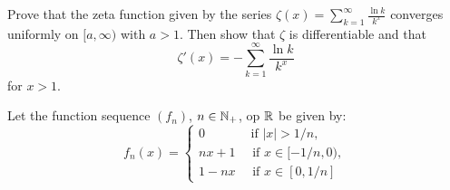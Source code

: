 \documentclass[week=12]{homework}
\date{\today}
\begin{document}
    \maketitle
    \thispagestyle{empty}
    \newpage
    \begin{questions}
		\let\firstquestion\question
		\renewcommand*{\question}{\vspace{7mm}\firstquestion}
        \firstquestion
		Prove that the zeta function given by the series $\zeta(x) = \sum_{k=1}^{\infty} \frac{\ln k}{k^x}$ converges uniformly on $[a,\infty)$ with $a > 1$. Then show that $\zeta$ is differentiable and that 
		\[
			\zeta'(x) = - \sum_{k=1}^{\infty} \frac{\ln k}{k^x}
		\]
		for $x > 1$.
		
		\question
		Let the function sequence $(f_n)$, $n \in \mathbb{N}_+$, op $\mathbb{R}$ be given by:
		\[
			f_n(x) = \begin{cases}
				0 		\qquad \quad \; \text{ if } |x| > 1/n, \\
				nx+1 	\quad \text{ if } x \in [-1/n,0), \\
				1 - nx 	\quad \text{ if } x \in [0,1/n]
			\end{cases}
		\]
\end{questions}
\end{document}

